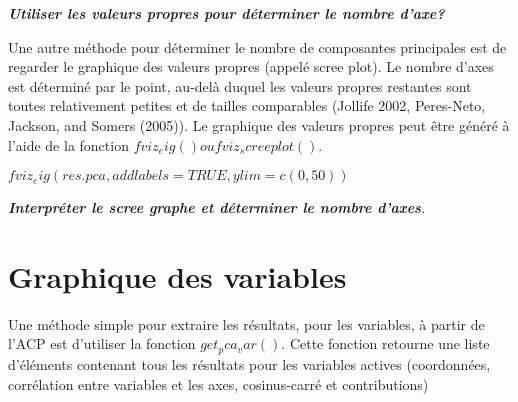 \documentclass[10pt,a4paper]{report}
\begin{document}
\textbf{\textit{Utiliser les valeurs propres pour déterminer le nombre d'axe?} }




Une autre méthode pour déterminer le nombre de composantes principales est de regarder le graphique des valeurs propres (appelé scree plot). Le nombre d’axes est déterminé par le point, au-delà duquel les valeurs propres restantes sont toutes relativement petites et de tailles comparables (Jollife 2002, Peres-Neto, Jackson, and Somers (2005)).
Le graphique des valeurs propres peut être généré à l’aide de la fonction $fviz_eig () ou fviz_screeplot () $.

$fviz_eig(res.pca, addlabels = TRUE, ylim = c(0, 50))$

\textit{\textbf{Interpréter le scree graphe et déterminer le nombre d'axes}.}

\section{Graphique des variables}

Une méthode simple pour extraire les résultats, pour les variables, à partir de l’ACP est d’utiliser la fonction $get_pca_var()$. Cette fonction retourne une liste d’éléments contenant tous les résultats pour les variables actives (coordonnées, corrélation entre variables et les axes, cosinus-carré et contributions)
\end{document}
